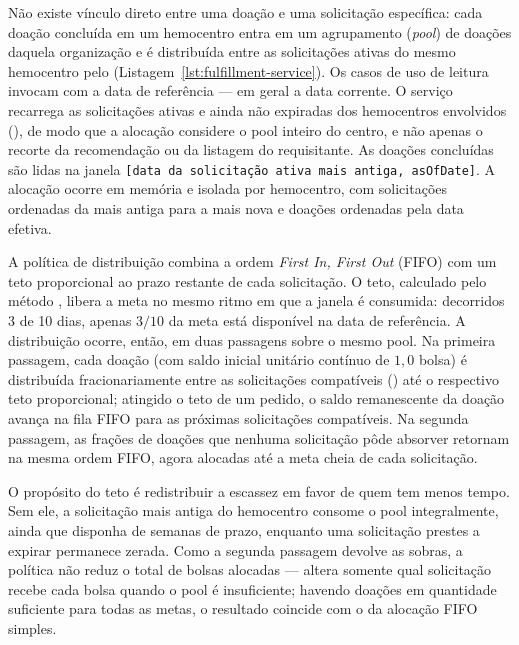 Não existe vínculo direto entre uma doação e uma solicitação específica: cada doação concluída em um hemocentro entra em um agrupamento (\textit{pool}) de doações daquela organização e é distribuída entre as solicitações ativas do mesmo hemocentro pelo  (Listagem~\ref{lst:fulfillment-service}). Os casos de uso de leitura invocam  com a data de referência  --- em geral a data corrente. O serviço recarrega as solicitações ativas e ainda não expiradas dos hemocentros envolvidos (), de modo que a alocação considere o pool inteiro do centro, e não apenas o recorte da recomendação ou da listagem do requisitante. As doações concluídas são lidas na janela \texttt{[data da solicitação ativa mais antiga, asOfDate]}. A alocação ocorre em memória e isolada por hemocentro, com solicitações ordenadas da mais antiga para a mais nova e doações ordenadas pela data efetiva.

A política de distribuição combina a ordem \textit{First In, First Out} (FIFO) com um teto proporcional ao prazo restante de cada solicitação. O teto, calculado pelo método , libera a meta no mesmo ritmo em que a janela  é consumida: decorridos 3 de 10 dias, apenas $3/10$ da meta está disponível na data de referência. A distribuição ocorre, então, em duas passagens sobre o mesmo pool. Na primeira passagem, cada doação (com saldo inicial unitário contínuo de $1{,}0$ bolsa) é distribuída fracionariamente entre as solicitações compatíveis () até o respectivo teto proporcional; atingido o teto de um pedido, o saldo remanescente da doação avança na fila FIFO para as próximas solicitações compatíveis. Na segunda passagem, as frações de doações que nenhuma solicitação pôde absorver retornam na mesma ordem FIFO, agora alocadas até a meta cheia de cada solicitação.

O propósito do teto é redistribuir a escassez em favor de quem tem menos tempo. Sem ele, a solicitação mais antiga do hemocentro consome o pool integralmente, ainda que disponha de semanas de prazo, enquanto uma solicitação prestes a expirar permanece zerada. Como a segunda passagem devolve as sobras, a política não reduz o total de bolsas alocadas --- altera somente qual solicitação recebe cada bolsa quando o pool é insuficiente; havendo doações em quantidade suficiente para todas as metas, o resultado coincide com o da alocação FIFO simples.

